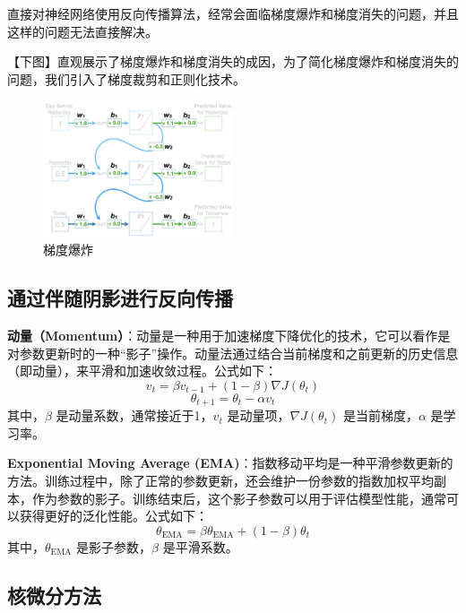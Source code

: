 \documentclass[12pt,a4paper]{amsart}
\begin{document}
直接对神经网络使用反向传播算法，经常会面临梯度爆炸和梯度消失的问题，并且这样的问题无法直接解决。

【下图】直观展示了梯度爆炸和梯度消失的成因，为了简化梯度爆炸和梯度消失的问题，我们引入了梯度裁剪和正则化技术。

\begin{figure}[htbp]
    \centering
    \includegraphics[width=0.5\textwidth]{./img/gradient_explosion.jpeg}
    \caption{梯度爆炸}
    \label{fig:lyapunov_spectrum}
  \end{figure}

\subsection{通过伴随阴影进行反向传播}

\textbf{动量（Momentum）}：动量是一种用于加速梯度下降优化的技术，它可以看作是对参数更新时的一种“影子”操作。动量法通过结合当前梯度和之前更新的历史信息（即动量），来平滑和加速收敛过程。公式如下：
\begin{equation}
v_t = \beta v_{t-1} + (1 - \beta) \nabla J(\theta_t)
\end{equation}
\begin{equation}
\theta_{t+1} = \theta_t - \alpha v_t
\end{equation}
其中，$\beta$ 是动量系数，通常接近于1，$v_t$ 是动量项，$\nabla J(\theta_t)$ 是当前梯度，$\alpha$ 是学习率。

\textbf{Exponential Moving Average (EMA)}：指数移动平均是一种平滑参数更新的方法。训练过程中，除了正常的参数更新，还会维护一份参数的指数加权平均副本，作为参数的影子。训练结束后，这个影子参数可以用于评估模型性能，通常可以获得更好的泛化性能。公式如下：
\begin{equation}
\theta_{\text{EMA}} = \beta \theta_{\text{EMA}} + (1 - \beta) \theta_t
\end{equation}
其中，$\theta_{\text{EMA}}$ 是影子参数，$\beta$ 是平滑系数。

\subsection{核微分方法}
\end{document}
